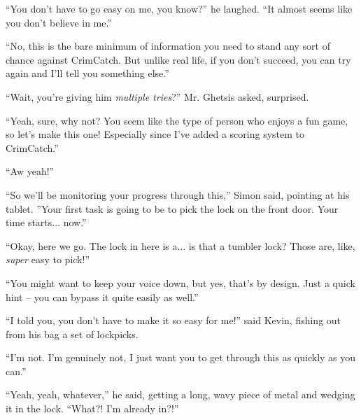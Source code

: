\documentclass[10pt,a4paper]{article}
\newcommand{\lang}[2]{ #2 \par}
\newcommand{\mainname}{Simon}
\newcommand{\policename}{Mr. Ghetsis}
\newcommand{\featurename}{CrimCatch}
\newcommand{\criminalname}{Kevin}
\begin{document}
\lang{-- Настолько легко мне не надо делать, -- засмеялся он. -- Ты что, так сильно в меня не веришь?}{``You don't have to go easy on me, you know?'' he laughed. ``It almost seems like you don't believe in me.''}
\lang{-- Нет, это самый минимум информации, что тебе потребуется, чтобы хотя бы как-то противостоять \featurename{}. Но, в отлиции от реальной жизни, если у тебя в первый раз не получится, ты можешь попробовать заново, а я тебе дам подсказку.}{``No, this is the bare minimum of information you need to stand any sort of chance against \featurename{}. But unlike real life, if you don't succeed, you can try again and I'll tell you something else.''}
\lang{-- Вы что, серьёзно даёте ему \emph{несколько попыток}? -- спросил \policename{} удивлённо.}{``Wait, you're giving him \emph{multiple tries}?'' \policename{} asked, surprised.}
\lang{--Ну да, почему бы нет? Кажется, тебе нравятся прикольные игры, поэтому и поэтому мы и это превратим в игру! Я тут даже прикрутил к \featurename{} систему оценивания.}{``Yeah, sure, why not? You seem like the type of person who enjoys a fun game, so let's make this one! Especially since I've added a scoring system to \featurename{}.''}
\lang{-- Круто!}{``Aw yeah!''}
\lang{-- Мы будем следить за твоим продвижением отсюда, -- сказал \mainname{}, указывая на планшет. -- Первое препятствие -- замок на входной двери. Время начинается... сейчас.}{``So we'll be monitoring your progress through this,'' \mainname{} said, pointing at his tablet. ''Your first task is going to be to pick the lock on the front door. Your time starts... now.''}
\lang{-- Окей, поехали. Тут замок... тут что, тумблерный замок? Их же, прям, \emph{супер} просто взламывать!}{``Okay, here we go. The lock in here is a... is that a tumbler lock? Those are, like, \emph{super} easy to pick!''}
\lang{-- Говори потише, но да, так и запланировано. И вот такая подсказка -- там довольно легко его вообще обойти.}{``You might want to keep your voice down, but yes, that's by design. Just a quick hint -- you can bypass it quite easily as well.''}
\lang{-- Я же попросил, не надо мне так всё облегчать! -- сказал \criminalname{}, доставая из сумки набор отмычек.}{``I told you, you don't have to make it so easy for me!'' said \criminalname{}, fishing out from his bag a set of lockpicks.}
\lang{-- Так ведь я и не упрощаю. Вот честно, я просто хочу, чтобы ты разобрался побыстрее.}{``I'm not. I'm genuinely not, I just want you to get through this as quickly as you can.''}
\lang{-- Ну да, ну ладно, -- сказал он, достав длинную гнутую металическую штуку и заклинив ею замок. -- Что?! Он уже открылся?!}{``Yeah, yeah, whatever,'' he said, getting a long, wavy piece of metal and wedging it in the lock. ``What?! I'm already in?!''}
\end{document}
